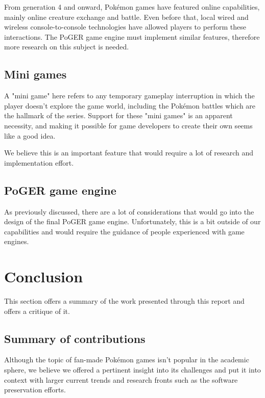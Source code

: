 \documentclass[11pt]{article}
\begin{document}
{From generation 4 and onward, Pokémon games have featured online capabilities, mainly online creature exchange and battle. Even before that, local wired and wireless console-to-console technologies have allowed players to perform these interactions. The PoGER game engine must implement similar features, therefore more research on this subject is needed.

\subsection{Mini games}

A "mini game" here refers to any temporary gameplay interruption in which the player doesn't explore the game world, including the Pokémon battles which are the hallmark of the series. Support for these "mini games" is an apparent necessity, and making it possible for game developers to create their own seems like a good idea. 

We believe this is an important feature that would require a lot of research and implementation effort.

\subsection{PoGER game engine}

As previously discussed, there are a lot of considerations that would go into the design of the final PoGER game engine. Unfortunately, this is a bit outside of our capabilities and would require the guidance of people experienced with game engines.






\newpage 
\section{Conclusion}

This section offers a summary of the work presented through this report and offers a critique of it.


\subsection{Summary of contributions}

Although the topic of fan-made Pokémon games isn't popular in the academic sphere, we believe we offered a pertinent insight into its challenges and put it into context with larger current trends and research fronts such as the software preservation efforts.

}
\end{document}
